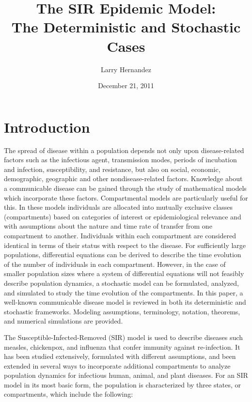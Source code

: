 \documentclass[reqno,11pt]{amsart}
\begin{document}
\title{ The SIR Epidemic Model: \\
          The Deterministic and Stochastic Cases}
\author{Larry Hernandez}
\date{December 21, 2011}                                           			%
\maketitle
\section{Introduction}

	The spread of disease within a population depends not only upon disease-related factors such as the infectious agent, transmission modes, periods of incubation and infection, susceptibility, and resistance, but also on social, economic, demographic, geographic and other nondisease-related factors. Knowledge about a communicable disease can be gained through the study of mathematical models which incorporate these factors. Compartmental models are particularly useful for this. In these models individuals are allocated into mutually exclusive classes (compartments) based on categories of interest or epidemiological relevance and with assumptions about the nature and time rate of transfer from one compartment to another. Individuals within each compartment are considered identical in terms of their status with respect to the disease. For sufficiently large populations, differential equations can be derived to describe the time evolution of the number of individuals in each compartment. However, in the case of smaller population sizes where a system of differential equations will not feasibly describe population dynamics, a stochastic model can be formulated, analyzed, and simulated to study the time evolution of the compartments. In this paper, a well-known communicable disease model is reviewed in both its deterministic and stochastic frameworks. Modeling assumptions, terminology, notation, theorems, and numerical simulations are provided.


	The Susceptible-Infected-Removed (SIR) model is used to describe diseases such measles, chickenpox, and influenza that confer immunity against re-infection. It has been studied extensively, formulated with different assumptions, and been extended in several ways to incorporate additional compartments to analyze population dynamics for infectious human, animal, and plant diseases. For an SIR model in its most basic form, the population is characterized by three states, or compartments, which include the following:
\end{document}
